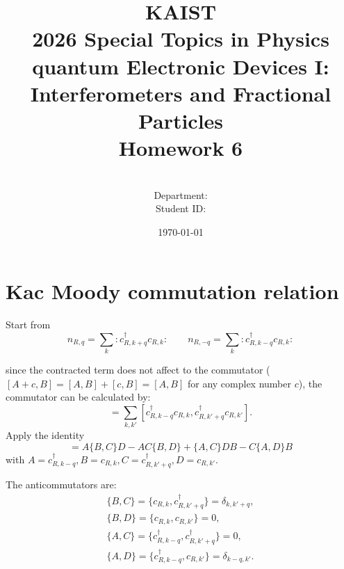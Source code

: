 \documentclass[a4paper,11pt]{article}
\title{KAIST\\2026 Special Topics in Physics quantum Electronic Devices I: Interferometers and Fractional Particles\\
Homework 6\bigskip}
\author{\textbf{\Large \name} \\
Department: \department\\
Student ID: \studentid}
\date{\today}
\begin{document}
\thispagestyle{empty}
\maketitle
\tableofcontents
{}
\setcounter{secnumdepth}{1}
\setcounter{tocdepth}{2}

\newcommand{\tr}{\operatorname{tr}}
\newcommand{\sgn}{\operatorname{sgn}}
\newcommand{\supp}{\operatorname{supp}}
\renewcommand{\Re}{\operatorname{Re}}
\renewcommand{\Im}{\operatorname{Im}}
\newcommand{\boltz}{k_{\mathrm{B}}}

\section{Kac Moody commutation relation}

Start from
\begin{equation}
  n_{R,q} = \sum_k :c^\dagger_{R,k+q}c_{R,k}: \qquad n_{R,-q} = \sum_k :c^\dagger_{R,k-q}c_{R,k}:
\end{equation}

since the contracted term does not affect to the commutator ($[A + c, B] = [A, B] + [c, B] = [A, B]$ for any complex number $c$), the commutator can be calculated by:
\begin{equation}
  [n_{R,-q}, n_{R,q}] = \sum_{k, k'} [c^\dagger_{R,k-q}c_{R,k}, c^\dagger_{R,k'+q}c_{R,k'}].
\end{equation}
Apply the identity
\begin{equation}
  [AB, CD] = A\{B, C\}D  - AC\{B, D\} + \{A, C\}DB - C\{A, D\}B
\end{equation}
with $A = c^\dagger_{R,k-q}, B = c_{R,k}, C = c^\dagger_{R,k'+q}, D = c_{R,k'}$.

The anticommutators are:
\begin{gather}
  \{B, C\} = \{c_{R,k}, c^\dagger_{R,k'+q}\} = \delta_{k, k'+q},\\
  \{B, D\} = \{c_{R,k}, c_{R,k'}\} = 0,\\
  \{A, C\} = \{c^\dagger_{R,k-q}, c^\dagger_{R,k'+q}\} = 0,\\
  \{A, D\} = \{c^\dagger_{R,k-q}, c_{R,k'}\} = \delta_{k-q, k'}.
\end{gather}
\end{document}
